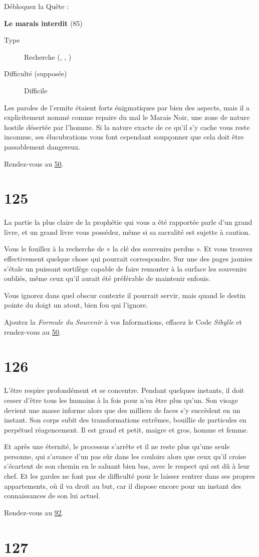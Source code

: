 \documentclass{report}
\newcommand{\gsection}[1]{
    \section{#1}
    \label{section-#1}
}
\newcommand{\glink}[1]{\hyperref[section-#1]{#1}}
\newcommand{\quest}[5]{
    \begin{mdframed}[innertopmargin=0.5cm,innerbottommargin=0.5cm,leftmargin=0.5cm,rightmargin=0.5cm]
        \begin{center}
            \textbf{#1} (#2)
        \end{center}
        \begin{description}
            \item[Type] #3
            \item[Difficulté (supposée)] #4
        \end{description}
        #5
    \end{mdframed}
}
\begin{document}
Débloquez la Quête :

\quest{Le marais interdit}{85}{Recherche (\ankh, \caduceus, \cross)}{Difficile}{
Les paroles de l'ermite étaient forts énigmatiques par bien des aspects, mais il a explicitement nommé comme repaire du mal le Marais Noir, une zone de nature hostile désertée par l'homme. Si la nature exacte de ce qu'il s'y cache vous reste inconnue, ses élucubrations vous font cependant soupçonner que cela doit être passablement dangereux.
}

Rendez-vous au \glink{50}.

\gsection{125}

La partie la plus claire de la prophétie qui vous a été rapportée parle d'un grand livre, et un grand livre vous possédez, même si sa sacralité est sujette à caution.

Vous le fouillez à la recherche de « la clé des souvenirs perdus ». Et vous trouvez effectivement quelque chose qui pourrait correspondre. Sur une des pages jaunies s'étale un puissant sortilège capable de faire remonter à la surface les souvenirs oubliés, même ceux qu'il aurait été préférable de maintenir enfouis.

Vous ignorez dans quel obscur contexte il pourrait servir, mais quand le destin pointe du doigt un atout, bien fou qui l'ignore.

Ajoutez la \emph{Formule du Souvenir} à vos Informations, effacez le Code \emph{Sibylle} et rendez-vous au \glink{50}.

\gsection{126}

L'être respire profondément et se concentre. Pendant quelques instants, il doit cesser d'être tous les humains à la fois pour n'en être plus qu'un. Son visage devient une masse informe alors que des milliers de faces s'y succèdent en un instant. Son corps subit des transformations extrêmes, bouillie de particules en perpétuel réagencement. Il est grand et petit, maigre et gros, homme et femme.

Et après une éternité, le processus s'arrête et il ne reste plus qu'une seule personne, qui s'avance d'un pas sûr dans les couloirs alors que ceux qu'il croise s'écartent de son chemin en le saluant bien bas, avec le respect qui est dû à leur chef. Et les gardes ne font pas de difficulté pour le laisser rentrer dans ses propres appartements, où il va droit au but, car il dispose encore pour un instant des connaissances de son lui actuel.

Rendez-vous au \glink{92}.

\gsection{127}
\end{document}
